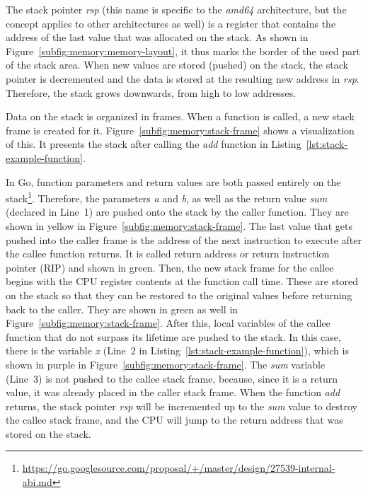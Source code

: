 The stack pointer \textit{rsp} (this name is specific to the \textit{amd64} architecture, but the concept applies to
other architectures as well) is a register that contains the address of the last value that was allocated on the stack.
As shown in Figure~\ref{subfig:memory:memory-layout}, it thus marks the border of the used part of the stack area.
When new values are stored (pushed) on the stack, the stack pointer is decremented and the data is stored at the
resulting new address in \textit{rsp}.
Therefore, the stack grows downwards, from high to low addresses.

Data on the stack is organized in frames.
When a function is called, a new stack frame is created for it.
Figure~\ref{subfig:memory:stack-frame} shows a visualization of this.
It presents the stack after calling the \textit{add} function in Listing~\ref{lst:stack-example-function}.



In Go, function parameters and return values are both passed entirely on the
stack\footnote{\url{https://go.googlesource.com/proposal/+/master/design/27539-internal-abi.md}}.
Therefore, the parameters \textit{a} and \textit{b}, as well as the return value \textit{sum} (declared in Line~1) are
pushed onto the stack by the caller function.
They are shown in yellow in Figure~\ref{subfig:memory:stack-frame}.
The last value that gets pushed into the caller frame is the address of the next instruction to execute after the callee
function returns.
It is called return address or return instruction pointer (\acrshort{RIP}) and shown in green.
Then, the new stack frame for the callee begins with the \acrshort{CPU} register contents at the function call time.
These are stored on the stack so that they can be restored to the original values before returning back to the caller.
They are shown in green as well in Figure~\ref{subfig:memory:stack-frame}.
After this, local variables of the callee function that do not surpass its lifetime are pushed to the stack.
In this case, there is the variable \textit{x} (Line~2 in Listing~\ref{lst:stack-example-function}), which is shown in
purple in Figure~\ref{subfig:memory:stack-frame}.
The \textit{sum} variable (Line~3) is not pushed to the callee stack frame, because, since it is a return value, it was
already placed in the caller stack frame.
When the function \textit{add} returns, the stack pointer \textit{rsp} will be incremented up to the \textit{sum} value
to destroy the callee stack frame, and the \acrshort{CPU} will jump to the return address that was stored on the stack.

